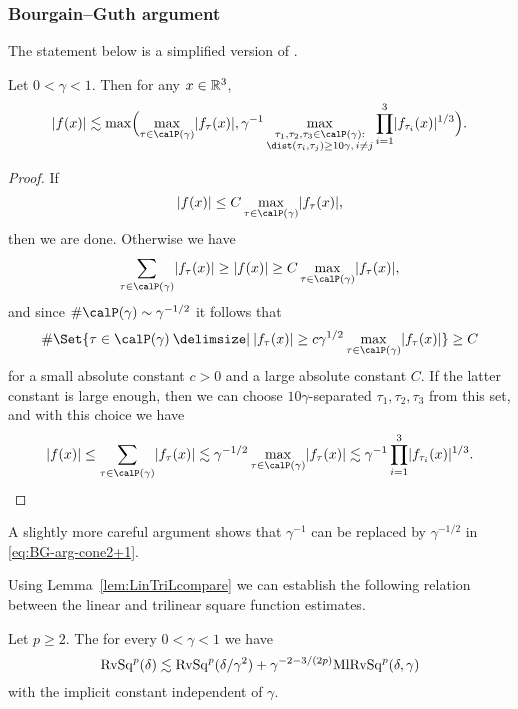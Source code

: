 \subsubsection{Bourgain--Guth argument}
The statement below is a simplified version of \cite[(23)]{MR2927399}.
\begin{lem}
\label{lem:LinTriLcompare}
Let $0 < \gamma < 1$.
Then for any $x \in \mathbb{R}^3$,
\begin{equation}
\label{eq:BG-arg-cone2+1}
\abs{ f(x) } \lesssim
\max \Bigl(
\max_{\tau \in \Part{\gamma}}\abs{ f_{\tau}(x) },
\gamma^{-1}
\max_{\substack{\tau_1,\tau_2,\tau_3 \in \Part{\gamma}: \\ \dist(\tau_i, \tau_j) \ge 10\gamma,\, i\neq j}}
\prod_{i=1}^{3} \abs{f_{\tau_i}(x)}^{1/3} \Bigr).
\end{equation}
\end{lem}
\begin{proof}
If
\[
\abs{ f(x) } \leq C \max_{\tau \in \Part{\gamma}}\abs{ f_{\tau}(x) },
\]
then we are done.
Otherwise we have
\[
\sum_{\tau \in \Part{\gamma}}\abs{ f_{\tau}(x) }
\geq
\abs{ f(x) }
\geq
C \max_{\tau \in \Part{\gamma}}\abs{ f_{\tau}(x) },
\]
and since $\#\Part{\gamma} \sim \gamma^{-1/2}$ it follows that
\[
\# \Set{ \tau \in \Part{\gamma} \given \abs{ f_{\tau}(x) } \geq c\gamma^{1/2} \max_{\tau \in \Part{\gamma}}\abs{ f_{\tau}(x) } }
\geq
C
\]
for a small absolute constant $c>0$ and a large absolute constant $C$.
If the latter constant is large enough, then we can choose $10 \gamma$-separated $\tau_{1},\tau_{2},\tau_{3}$ from this set, and with this choice we have
\[
\abs{ f(x) }
\leq
\sum_{\tau \in \Part{\gamma}}\abs{ f_{\tau}(x) }
\lesssim
\gamma^{-1/2} \max_{\tau \in \Part{\gamma}}\abs{ f_{\tau}(x) }
\lesssim
\gamma^{-1} \prod_{i=1}^{3} \abs{f_{\tau_i}(x)}^{1/3}.
\qedhere
\]
\end{proof}
\begin{remark}
A slightly more careful argument shows that $\gamma^{-1}$ can be replaced by $\gamma^{-1/2}$ in \eqref{eq:BG-arg-cone2+1}.
\end{remark}
Using Lemma~\ref{lem:LinTriLcompare} we can establish the following relation between the linear and trilinear square function estimates.

\begin{prop} \label{prop:MSQmeanSQ}
Let $p \ge 2$.
The for every $0<\gamma<1$ we have
\begin{equation}
\label{eq:RvSq-vs-MlRvSq}
\mathrm{RvSq}^{p}(\delta)
\lesssim
\mathrm{RvSq}^{p}(\delta / \gamma^2) + \gamma^{-2-3/(2p)} \mathrm{MlRvSq}^{p}(\delta,\gamma)
\end{equation}
with the implicit constant independent of $\gamma$.
\end{prop}

